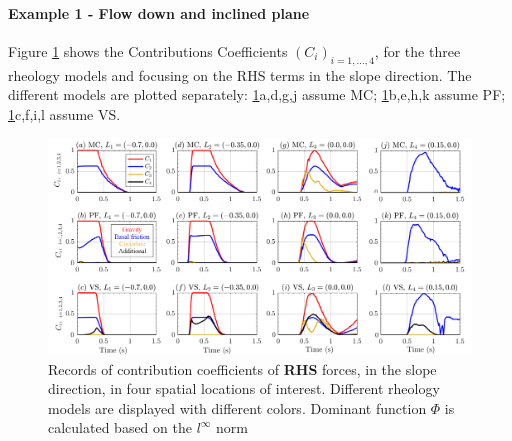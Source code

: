 \documentclass{article}
\begin{document}
\paragraph{Example 1 - Flow down and inclined plane}
Figure \ref{fig:Ramp-Ci_x} shows the Contributions Coefficients $(C_i)_{i=1,\dots,4}$, for the three rheology models and focusing on the RHS terms in the slope direction. The different models are plotted separately: \ref{fig:Ramp-Ci_x}a,d,g,j assume MC; \ref{fig:Ramp-Ci_x}b,e,h,k assume PF; \ref{fig:Ramp-Ci_x}c,f,i,l assume VS.
\begin{figure}[H]
         \centering
        \includegraphics[width=1\textwidth]{InclinedPlane/ForceContrib/Ci_x.png}
        \caption{Records of contribution coefficients of \textbf{RHS} forces, in the slope direction, in four spatial locations of interest. Different rheology models are displayed with different colors. Dominant function $\Phi$ is calculated based on the $l^\infty$ norm}
        \label{fig:Ramp-Ci_x}
\end{figure}
\end{document}
